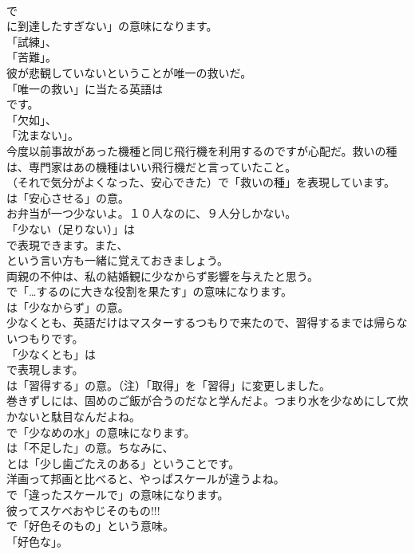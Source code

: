 \documentclass[8pt]{extreport}
\begin{document}
\begin{CJK}{UTF8}{min}
\\	で
\\	に到達したすぎない」の意味になります。
\\	「試練」、
\\	「苦難」。	
\\	彼が悲観していないということが唯一の救いだ。 
\\	「唯一の救い」に当たる英語は
\\	です。
\\	「欠如」、
\\	「沈まない」。	
\\	今度以前事故があった機種と同じ飛行機を利用するのですが心配だ。救いの種は、専門家はあの機種はいい飛行機だと言っていたこと。 
\\	（それで気分がよくなった、安心できた）で「救いの種」を表現しています。
\\	は「安心させる」の意。	
\\	お弁当が一つ少ないよ。１０人なのに、９人分しかない。 
\\	「少ない（足りない）」は
\\	で表現できます。また、
\\	という言い方も一緒に覚えておきましょう。	
\\	両親の不仲は、私の結婚観に少なからず影響を与えたと思う。 
\\	で「…するのに大きな役割を果たす」の意味になります。
\\	は「少なからず」の意。	
\\	少なくとも、英語だけはマスターするつもりで来たので、習得するまでは帰らないつもりです。 
\\	「少なくとも」は 
\\	で表現します。
\\	は「習得する」の意。（注）「取得」を「習得」に変更しました。	
\\	巻きずしには、固めのご飯が合うのだなと学んだよ。つまり水を少なめにして炊かないと駄目なんだよね。 
\\	で「少なめの水」の意味になります。
\\	は「不足した」の意。ちなみに、
\\	とは「少し歯ごたえのある」ということです。	
\\	洋画って邦画と比べると、やっぱスケールが違うよね。 
\\	で「違ったスケールで」の意味になります。	
\\	彼ってスケベおやじそのもの!!! 
\\	で「好色そのもの」という意味。
\\	「好色な」。	

\end{CJK}
\end{document}
